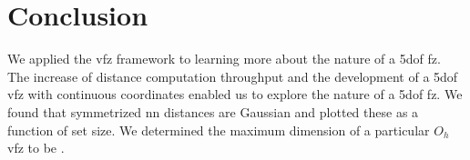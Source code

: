 \documentclass[final,twocolumn,12pt]{elsarticle}
\begin{document}
	\section{Conclusion} \label{sec:conclusion}
	We applied the \gls{vfz} framework to learning more about the nature of a \gls{5dof} \gls{fz}.
	The increase of distance computation throughput and the development of a \gls{5dof} \gls{vfz} with continuous coordinates enabled us to explore the nature of a \gls{5dof} \gls{fz}. We found that symmetrized \gls{nn} distances are Gaussian and plotted these as a function of set size. We determined the maximum dimension of a particular $O_h$ \gls{vfz} to be \dimOne{}.
	
\end{document}
